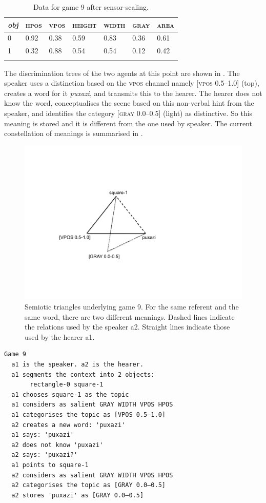 \begin{table}
\begin{center}
\begin{tabular}{ l  l  l  l  l  l  l }
\lsptoprule
{\itshape obj} & \textsc{hpos} & \textsc{vpos} & \textsc{height} & \textsc{width} & \textsc{gray} & \textsc{area} \\ \midrule
0 & 0.92 & 0.38 & 0.59 & 0.83 & 0.36 & 0.61\\ 
1 & 0.32 & 0.88 & 0.54 & 0.54 & 0.12 & 0.42\\ 
\lspbottomrule
\end{tabular}
\caption{\label{tab:different}Data for game 9 after sensor-scaling.}
\end{center}
\end{table}
The discrimination trees of the two agents at this point
are shown in . 
The speaker uses a distinction based on the 
\textsc{vpos} channel namely [\textsc{vpos} 0.5–1.0] (top), creates
a word for it \textit{puxazi}, and transmits this to the hearer. 
The hearer does not know the word,
conceptualises the scene based on this non-verbal
hint from the speaker, and identifies the category
{}[\textsc{gray} 0.0–0.5] (light) as distinctive. So this 
meaning is stored and it is different from the one used by 
speaker. The current constellation of meanings
is summarised in . 

\begin{figure}[h]
	\centerline{\includegraphics[width=.45\textwidth]{chap6/figs/triangle4.pdf}}
	\caption{\label{triangle4}Semiotic triangles
		underlying game 9. For the same referent and the same word, 
		there are two different meanings. Dashed lines indicate
		the relations used by the speaker {\bfshape  a2}. Straight lines
		indicate those used by the hearer {\bfshape  a1}.}
\end{figure}

\begin{verbatim}
Game 9
  a1 is the speaker. a2 is the hearer. 
  a1 segments the context into 2 objects: 
       rectangle-0 square-1 
  a1 chooses square-1 as the topic 
  a1 considers as salient GRAY WIDTH VPOS HPOS 
  a1 categorises the topic as [VPOS 0.5–1.0]
  a2 creates a new word: 'puxazi'
  a1 says: 'puxazi'
  a2 does not know 'puxazi'
  a2 says: 'puxazi?'
  a1 points to square-1
  a2 considers as salient GRAY WIDTH VPOS HPOS
  a2 categorises the topic as [GRAY 0.0–0.5]
  a2 stores 'puxazi' as [GRAY 0.0–0.5]
\end{verbatim}

